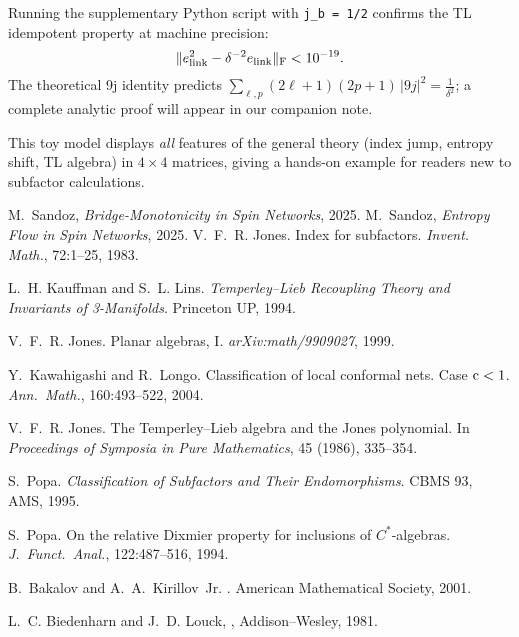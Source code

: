 \documentclass[11pt]{article}
\begin{document}
Running the supplementary Python script with \texttt{j\_b = 1/2} confirms
the TL idempotent property at machine precision:
\[
  \|e_{\mathrm{link}}^{2}-\delta^{-2}e_{\mathrm{link}}\|_{\rm F} < 10^{-19}.
\]
The theoretical 9j identity predicts
$\sum_{\ell,p}(2\ell\!+\!1)(2p\!+\!1)\,|9j|^{2} = \tfrac{1}{\delta^{2}}$;
a complete analytic proof will appear in our companion note.


\medskip
This toy model displays \emph{all} features of the general theory
(index jump, entropy shift, TL algebra) in $4\times4$ matrices, giving a
hands-on example for readers new to subfactor calculations.


\begin{thebibliography}{9}
 M.~Sandoz, \emph{Bridge-Monotonicity in Spin Networks}, 2025.
 M.~Sandoz, \emph{Entropy Flow in Spin Networks}, 2025.
V.~F.~R. Jones.
\newblock Index for subfactors.
\newblock \emph{Invent. Math.}, 72:1–25, 1983.

L.~H. Kauffman and S.~L. Lins.
\newblock \emph{Temperley–Lieb Recoupling Theory and Invariants of 3-Manifolds}.
\newblock Princeton UP, 1994.

V.~F.~R. Jones.
\newblock Planar algebras, I.
\newblock \emph{arXiv:math/9909027}, 1999.

Y.~Kawahigashi and R.~Longo.
\newblock Classification of local conformal nets.  Case ${\rm c}<1$.
\newblock \emph{Ann.\ Math.}, 160:493–522, 2004.

V.~F.~R. Jones.
\newblock The Temperley–Lieb algebra and the Jones polynomial.
\newblock In \emph{Proceedings of Symposia in Pure Mathematics}, 45 (1986), 335–354.

S.~Popa.
\newblock \emph{Classification of Subfactors and Their Endomorphisms}.
\newblock CBMS 93, AMS, 1995.

S.~Popa.
\newblock On the relative Dixmier property for inclusions of $C^{\ast}$‐algebras.
\newblock \emph{J.\ Funct.\ Anal.}, 122:487–516, 1994.

  B.~Bakalov and A.~A.~Kirillov~Jr.
  .
  \newblock American Mathematical Society, 2001.

L.~C. Biedenharn and J.~D. Louck,
,
\newblock Addison–Wesley, 1981.
  
\end{thebibliography}
\end{document}
